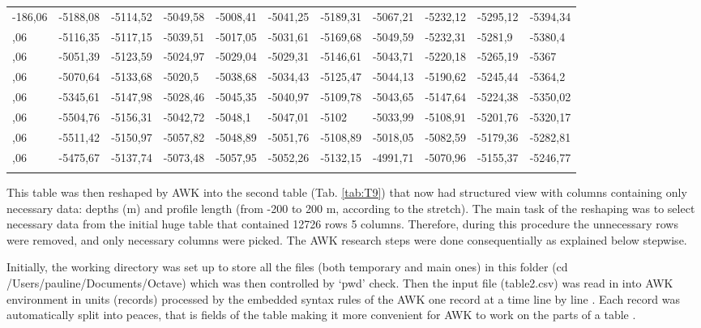 \documentclass[11pt,a4paper]{report}
\begin{document}
{\begin{table}[H]
\begin{center}
{\begin{tabular}{ p{1.4cm} p{1.4cm} p{1.4cm} p{1.4cm}  p{1.4cm} p{1.4cm} p{1.4cm} p{1.4cm} p{1.4cm} p{1.4cm} p{1.4cm}}
		-186,06 & -5188,08 & -5114,52 & -5049,58 & -5008,41 & -5041,25 & -5189,31 & -5067,21 & -5232,12 & -5295,12 & -5394,34 \\	
		\arrayrulecolor[RGB]{230,205,227}\hline\hline
		-184,06 & -5116,35 & -5117,15 & -5039,51 & -5017,05 & -5031,61 & -5169,68 & -5049,59 & -5232,31 & -5281,9 & -5380,4 \\
		\arrayrulecolor[RGB]{230,205,227}\hline\hline
		-182,06 & -5051,39 & -5123,59 & -5024,97 & -5029,04 & -5029,31 & -5146,61 & -5043,71 & -5220,18 & -5265,19 & -5367 \\
		\arrayrulecolor[RGB]{230,205,227}\hline\hline
		-180,06 & -5070,64 & -5133,68 & -5020,5 & -5038,68 & -5034,43 & -5125,47 & -5044,13 & -5190,62 & -5245,44 & -5364,2 \\
		\arrayrulecolor[RGB]{232,211,199}\hline\hline
		-178,06 & -5345,61 & -5147,98 & -5028,46 & -5045,35 & -5040,97 & -5109,78 & -5043,65 & -5147,64 & -5224,38 & -5350,02 \\
		\arrayrulecolor[RGB]{238,187,203}\hline\hline
		-176,06 & -5504,76 & -5156,31 & -5042,72 & -5048,1 & -5047,01 & -5102 & -5033,99 & -5108,91 & -5201,76 & -5320,17 \\
		\arrayrulecolor[RGB]{244,179,194}\hline\hline
		-174,06 & -5511,42 & -5150,97 & -5057,82 & -5048,89 & -5051,76 & -5108,89 & -5018,05 & -5082,59 & -5179,36 & -5282,81 \\
		\arrayrulecolor[RGB]{240,145,153}\hline\hline
		-172,06 & -5475,67 & -5137,74 & -5073,48 & -5057,95 & -5052,26 & -5132,15 & -4991,71 & -5070,96 & -5155,37 & -5246,77 \\
		\arrayrulecolor[RGB]{240,145,153}\hline\hline\hline
	\end{tabular}
	}
\end{center}
\end{table}

This table was then reshaped by AWK into the second table (Tab. \ref{tab:T9}) that now had structured view with columns containing only necessary data: depths (m) and profile length (from -200 to 200 m, according to the stretch). The main task of the reshaping was to select necessary data from the initial huge table that contained 12726 rows 5 columns. Therefore, during this procedure the unnecessary rows were removed, and only necessary columns were picked. The AWK research steps were done consequentially as explained below stepwise. 

Initially, the working directory was set up to store all the files (both temporary and main ones) in this folder (cd /Users/pauline/Documents/Octave) which was then controlled by ‘pwd’ check. Then the input file (table2.csv) was read in into AWK environment in units (records) processed by the embedded syntax rules of the AWK one record at a time line by line \cite{DoughertyRobbins}. Each record was automatically split into peaces, that is fields of the table making it more convenient for AWK to work on the parts of a table \cite{Robbins2000}.

}
\end{document}
